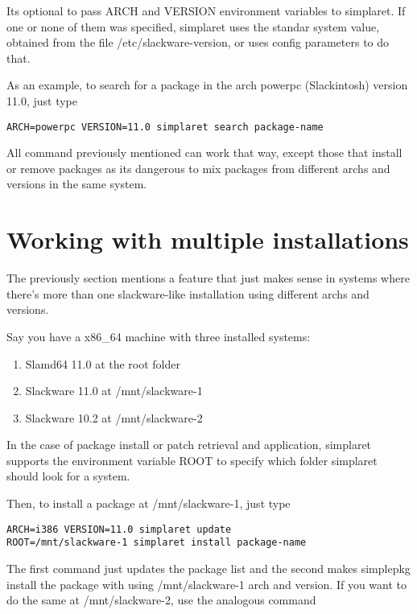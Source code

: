 \documentclass{article}
\begin{document}
Its optional to pass ARCH and VERSION environment variables to simplaret. If one or none of them was specified, simplaret uses the standar system value, obtained from the file /etc/slackware-version, or uses config parameters to do that.

As an example, to search for a package in the arch powerpc (Slackintosh) version 11.0, just type

\begin{verbatim}
ARCH=powerpc VERSION=11.0 simplaret search package-name
\end{verbatim}

All command previously mentioned can work that way, except those that install or remove packages as its dangerous to mix packages from different archs and versions in the same system.

\section{Working with multiple installations}

The previously section mentions a feature that just makes sense in systems where there's more than one slackware-like installation using different archs and versions.

Say you have a x86\_64 machine with three installed systems:

\begin{enumerate}
  \item Slamd64 11.0 at the root folder
  \item Slackware 11.0 at /mnt/slackware-1
  \item Slackware 10.2 at /mnt/slackware-2
\end{enumerate}

In the case of package install or patch retrieval and application, simplaret supports the environment variable ROOT to specify which folder simplaret should look for a system.

Then, to install a package at /mnt/slackware-1, just type

\begin{verbatim}
ARCH=i386 VERSION=11.0 simplaret update
ROOT=/mnt/slackware-1 simplaret install package-name
\end{verbatim}

The first command just updates the package list and the second makes simplepkg install the package with using /mnt/slackware-1 arch and version. If you want to do the same at /mnt/slackware-2, use the analogous command
\end{document}
